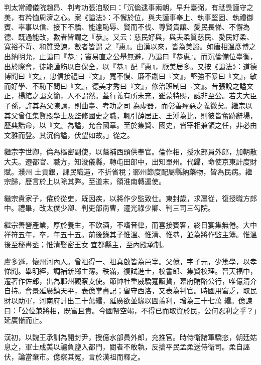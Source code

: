 \begin{pinyinscope}
 判太常禮儀院趙昂、判考功張洎駁曰：「沉倫逮事兩朝，早升臺弼，有祗畏謹守之美，有矜恤周濟之心。案《謚法》：不懈於位，與夫謹事奉上、執事堅固、執禮御賓、率事以信、接下不驕、能遠恥辱、賢而不伐、尊賢貴讓、愛民長悌、不懈為德、既過能改，數者皆謂之『恭』。又云：慈民好與，與夫柔質慈民、愛民好柔、寬裕不苛、和質受諫，數者皆謂
 之『惠』。由漢以來，皆為美謚。如唐相溫彥博之出納明允，止謚曰『恭』；竇易直之公舉無避，乃謚曰『恭惠』。而沉倫備位臺衡，出於際會，徒能謹飭以自保全，以『恭』配『惠』，厥美居多。又按《謚法》：道德博聞曰『文』，忠信接禮曰『文』，寬不慢、廉不劌曰『文』，堅強不暴曰『文』，敏而好學、不恥下問曰『文』，德美才秀曰『文』，修治班制曰『文』。昔張說之謚文正，楊綰之謚文簡，人不謂然。蓋行義有所未充，雖蒙特賜，誠非至公。若夫大臣子孫，許其為父陳請，則曲臺、考功之司
 為虛器，而彰善癉惡之義微矣。繼宗以其父曾任集賢殿學士及監修國史之職，輒引薛居正、王溥為比，則彼皆奮跡辭場，歷典誥命，以『文』為謚，允合國章。至於集賢、國史，皆宰相兼領之任，非必由文雅而登。其沉倫謚，伏望如故。」從之。



 繼宗字世卿，倫為樞密副使，以蔭補西頭供奉官。倫作相，授水部員外郎，加朝散大夫。遷都官、職方，知浚儀縣，轉屯田郎中，出知單州。代歸，命使京東計度財賦。濮州
 土貢銀，課民織造，不折省稅；鄆州節度配屬縣納藥物，皆為民病。繼宗歸，歷言於上以除其弊。至道末，領淮南轉運使。



 繼宗貴家子，倦於從吏，既因疾，以將作少監致仕。東封歲，求扈從，復授職方郎中。禮畢，改太僕少卿、判吏部南曹，遷光祿少卿、判三司三勾院。



 繼宗善營產業，厚於養生，不飲酒，不嗜音律，而喜接賓客，終日宴集無倦。大中祥符五年，卒，年五十五。前後錄其子惟溫、惟清、惟恭，並為將作監主簿。惟溫後至秘書丞；惟清娶密王女
 宜都縣主，至內殿承制。



 盧多遜，懷州河內人。曾祖得一、祖真啟皆為邑宰。父億，字子元，少篤學，以孝悌聞。舉明經，調補新鄉主簿。秩滿，復試進士，校書郎、集賢校理。晉天福中，遷著作佐郎，出為鄆州觀察支使。節帥杜重威驕蹇黷貨，幕府賄賂公行，唯億清介自持。會景延廣鎮天平，表億掌書記；留守西洛，又表為判官。時國用窘乏，取民財以助軍，河南府計出二十萬緡，延廣欲並緣以圖羨利，增為三十七萬
 緡。億諫曰：「公位兼將相，既富且貴。今國帑空竭，不得已而取資於民，公何忍利之乎？」延廣慚而止。



 漢初，以魏王承訓為開封尹，授億水部員外郎，充推官。時侍衛諸軍驕恣，朝廷姑息之，軍士成美以驢負鹽入都門，閽者不敢執，反擒平民孟柔送侍衛司。柔自誣伏，論當棄市。億察其冤，言於漢祖而釋之。




\end{pinyinscope}
